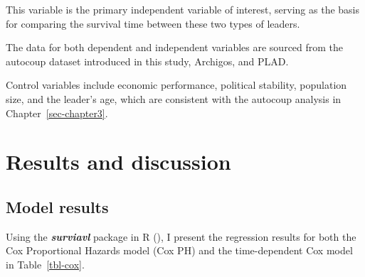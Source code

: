 \documentclass[
  12pt,
]{report}
\begin{document}
This variable is the primary independent variable of interest, serving
as the basis for comparing the survival time between these two types of
leaders.

The data for both dependent and independent variables are sourced from
the autocoup dataset introduced in this study, Archigos, and PLAD.

Control variables include economic performance, political stability,
population size, and the leader's age, which are consistent with the
autocoup analysis in Chapter~\ref{sec-chapter3}.

\section{Results and discussion}\label{results-and-discussion}

\subsection{Model results}\label{model-results}

Using the \textbf{\emph{surviavl}} package in R
(), I present the regression
results for both the Cox Proportional Hazards model (Cox PH) and the
time-dependent Cox model in Table~\ref{tbl-cox}.
\end{document}
